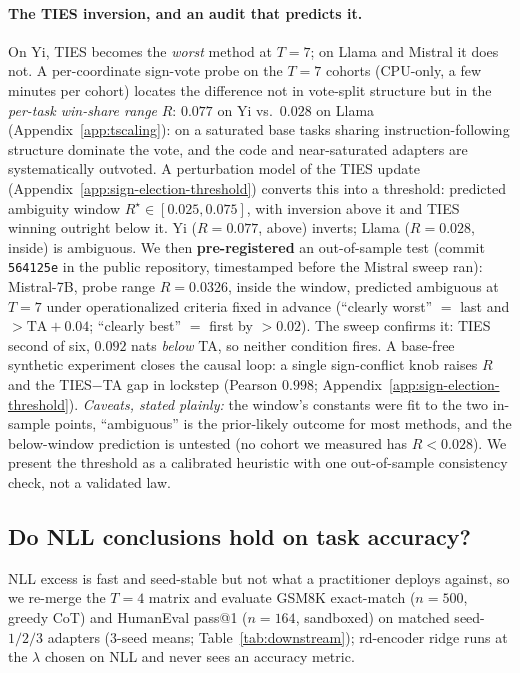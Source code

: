 \paragraph{The TIES inversion, and an audit that predicts it.} On Yi,
TIES becomes the \emph{worst} method at $T = 7$; on Llama and Mistral
it does not. A per-coordinate sign-vote probe on the $T = 7$ cohorts
(CPU-only, a few minutes per cohort) locates the difference not in
vote-split structure but in the \emph{per-task win-share range} $R$:
$0.077$ on Yi vs.\ $0.028$ on Llama (Appendix~\ref{app:tscaling}):
on a saturated base tasks sharing instruction-following structure
dominate the vote, and the code and near-saturated adapters are
systematically outvoted. A perturbation
model of the TIES update (Appendix~\ref{app:sign-election-threshold})
converts this into a threshold: predicted ambiguity window
$R^\star \in [0.025, 0.075]$, with inversion above it and TIES winning
outright below it. Yi ($R = 0.077$, above) inverts; Llama
($R = 0.028$, inside) is ambiguous. We then \textbf{pre-registered} an
out-of-sample test (commit \texttt{564125e} in the public repository,
timestamped before the Mistral sweep ran): Mistral-7B, probe
range $R = 0.0326$, inside the window, predicted ambiguous at $T = 7$
under operationalized criteria fixed in advance (``clearly worst'' $=$
last and $> \mathrm{TA} + 0.04$; ``clearly best'' $=$ first by
$> 0.02$). The sweep confirms it: TIES second of six, $0.092$ nats
\emph{below} TA, so neither condition fires. A base-free synthetic
experiment closes the causal loop: a single sign-conflict knob raises
$R$ and the TIES$-$TA gap in lockstep (Pearson $0.998$;
Appendix~\ref{app:sign-election-threshold}). \emph{Caveats, stated
plainly:} the window's constants were fit to the two in-sample points,
``ambiguous'' is the prior-likely outcome for most methods, and the
below-window prediction is untested (no cohort we measured has
$R < 0.028$). We present the threshold as a calibrated heuristic with
one out-of-sample consistency check, not a validated law.

\subsection{Do NLL conclusions hold on task accuracy?}
\label{subsec:exp-downstream-gsm8k}

NLL excess is fast and seed-stable but not what a practitioner
deploys against, so we re-merge the $T = 4$ matrix and evaluate GSM8K
exact-match ($n = 500$, greedy CoT) and HumanEval pass@1 ($n = 164$,
sandboxed) on matched seed-$1/2/3$ adapters ($3$-seed means;
Table~\ref{tab:downstream}); rd-encoder ridge runs at the $\lambda$
chosen on NLL and never sees an accuracy metric.

